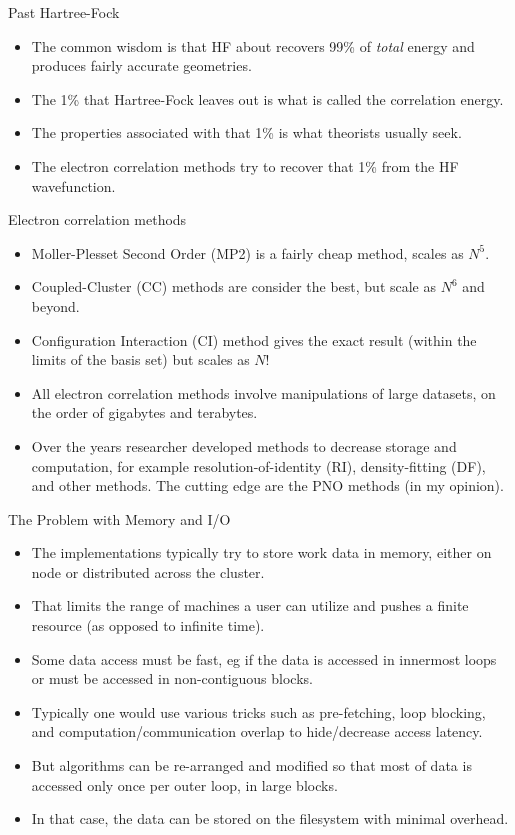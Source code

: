 \documentclass{beamer}
\begin{document}
\begin{frame}{Past Hartree-Fock}
\begin{itemize}
\item The common wisdom is that HF about recovers 99\% of {\em total} energy and produces fairly accurate geometries.
\item The 1\% that Hartree-Fock leaves out is what is called the correlation energy.
\item The properties associated with that 1\% is what theorists usually seek.
\item The electron correlation methods try to recover that 1\% from the HF wavefunction.
\end{itemize}
\end{frame}

\begin{frame}{Electron correlation methods}
\begin{itemize}
\item Moller-Plesset Second Order (MP2) is a fairly cheap method, scales as $N^5$.
\item Coupled-Cluster (CC) methods are consider the best, but scale as $N^6$ and beyond.
\item Configuration Interaction (CI) method gives the exact result (within the limits of the basis set) but scales as $N!$
\item All electron correlation methods involve manipulations of large datasets, on the order of gigabytes and terabytes.
\item Over the years researcher developed methods to decrease storage and computation, for example resolution-of-identity (RI), density-fitting (DF), and other methods.  The cutting edge are the PNO methods (in my opinion).
\end{itemize}
\end{frame}

\begin{frame}{The Problem with Memory and I/O}
\begin{itemize}
\item The implementations typically try to store work data in memory,
  either on node or distributed across the cluster.
\item That limits the range of machines a user can utilize and pushes a finite resource (as opposed to infinite time).
\item Some data access must be fast, eg if the data is accessed in innermost loops or must be accessed in non-contiguous blocks.
\item Typically one would use various tricks such as pre-fetching, loop blocking, and computation/communication overlap to hide/decrease access latency.
\item But algorithms can be re-arranged and modified so that most of data is accessed only once per outer loop, in large blocks.
\item In that case, the data can be stored on the filesystem with minimal overhead.
\end{itemize}
\end{frame}
\end{document}
